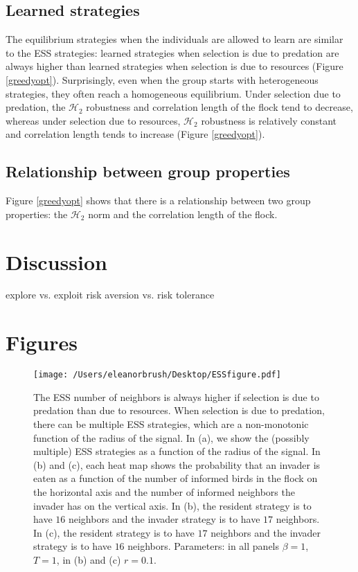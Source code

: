 \documentclass{article}
\begin{document}
\subsection{Learned strategies }
The equilibrium strategies when the individuals are allowed to learn are similar to the ESS strategies: learned strategies when selection is due to predation are always higher than learned strategies when selection is due to resources (Figure \ref{greedyopt}). Surprisingly, even when the group starts with heterogeneous strategies, they often reach a homogeneous equilibrium. Under selection due to predation, the $\mathscr{H}_2$ robustness and correlation length of the flock tend to decrease, whereas under selection due to resources, $\mathscr{H}_2$ robustness is relatively constant and correlation length tends to increase (Figure \ref{greedyopt}).

\subsection{Relationship between group properties }
Figure \ref{greedyopt} shows that there is a relationship between two group properties: the $\mathscr{H}_2$ norm and the correlation length of the flock.

\section{Discussion}
explore vs. exploit 
risk aversion vs. risk tolerance

\section{Figures }
\begin{figure}[ht]
\texttt{[image: /Users/eleanorbrush/Desktop/ESSfigure.pdf]}
\caption{\label{ESS} The ESS number of neighbors is always higher if selection is due to predation than due to resources. When selection is due to predation, there can be multiple ESS strategies, which are a non-monotonic function of the radius of the signal. In (a), we show the (possibly multiple) ESS strategies as a function of the radius of the signal. In (b) and (c), each heat map shows the probability that an invader is eaten as a function of the number of informed birds in the flock on the horizontal axis and the number of informed neighbors the invader has on the vertical axis. In (b), the resident strategy is to have $16$ neighbors and the invader strategy is to have $17$ neighbors. In (c), the resident strategy is to have $17$ neighbors and the invader strategy is to have $16$ neighbors. Parameters:  in all panels $\beta=1$, $T=1$, in (b) and (c) $r=0.1$. 
}
\end{figure}
\end{document}

